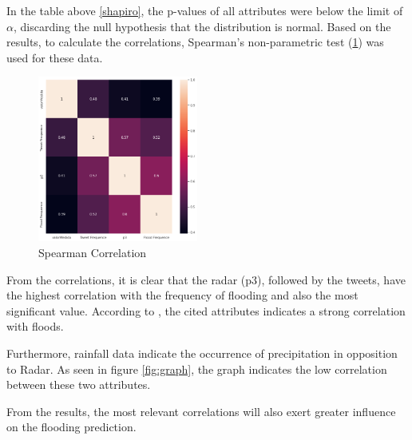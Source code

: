 In the table above \ref{shapiro}, the p-values of all attributes were below the limit of $\alpha$, discarding the null hypothesis that the distribution is normal. Based on the results, to calculate the correlations, Spearman's non-parametric test (\ref{fig:corr}) was used for these data. 

\begin{figure}[H]
	\centering
	\includegraphics[width=0.47\textwidth]{figs/corr.png}
	\caption{Spearman Correlation}
	\label{fig:corr}
\end{figure}

From the correlations, it is clear that the radar (p3), followed by the tweets, have the highest correlation with the frequency of flooding and also the most significant value. According to , the cited attributes indicates a strong correlation with floods. 

Furthermore, rainfall data indicate the occurrence of precipitation in opposition to Radar. As seen in figure \ref{fig:graph}, the graph indicates the low correlation between these two attributes.

From the results, the most relevant correlations will also exert greater influence on the flooding prediction.
